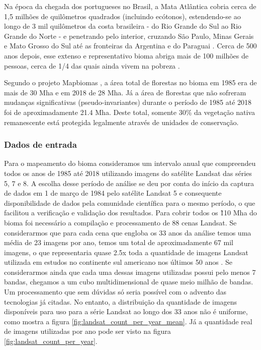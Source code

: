 Na época da chegada dos portugueses no Brasil, a Mata Atlântica cobria cerca de 1,5 milhões de quilômetros quadrados (incluindo ecótonos), estendendo-se ao longo de 3 mil quilômetros da costa brasileira - do Rio Grande do Sul ao Rio Grande do Norte - e penetrando pelo interior, cruzando São Paulo, Minas Gerais e Mato Grosso do Sul até as fronteiras da Argentina e do Paraguai \citep{scarano2014}. Cerca de 500 anos depois, esse extenso e representativo bioma abriga mais de 100 milhões de pessoas, cerca de 1/4 das quais ainda vivem na pobreza \citep{scarano2014}.

Segundo o projeto Mapbiomas \citep{Souza2019}, a área total de florestas no bioma em 1985 era de mais de 30 Mha e em 2018 de 28 Mha. Já a área de florestas que não sofreram mudanças significativas (pseudo-invariantes) durante o período de 1985 até 2018 foi de aproximadamente 21.4 Mha. Deste total, somente  30\% da vegetação nativa remanescente está protegida legalmente através de unidades de conservação.


\subsubsection{Dados de entrada}
\hspace{13pt} Para o mapeamento do bioma consideramos um intervalo anual que compreendeu todos os anos de 1985 até 2018 utilizando imagens do satélite Landsat das séries 5, 7 e 8. A escolha desse período de análise se deu por conta do início da captura de dados em 1 de março de 1984 pelo satélite Landsat 5 e consequente disponibilidade de dados pela comunidade científica para o mesmo período, o que facilitou a verificação e validação dos resultados. Para cobrir todos os \~110 Mha do bioma foi necessário a compilação e processamento de 88 cenas Landsat. Se considerarmos que para cada cena que engloba os 33 anos da análise temos uma média de 23 imagens por ano, temos um total de aproximadamente 67 mil imagens, o que representaria quase 2.5x toda a quantidade de imagens Landsat utilizada em estudos no continente sul americano nos últimos 50 anos \citep{Hemati2021}. Se considerarmos ainda que cada uma dessas imagens utilizadas possui pelo menos 7 bandas, chegamos a um cubo multidimensional de quase meio milhão de bandas. Um processamento que sem dúvidas só seria possível com o advento das tecnologias já citadas. No entanto, a distribuição da quantidade de imagens disponíveis para uso para a série Landsat ao longo dos 33 anos não é uniforme, como mostra a figura \ref{fig:landsat_count_per_year_mean}. Já a quantidade real de imagens utilizadas por ano pode ser visto na figura \ref{fig:landsat_count_per_year}.


